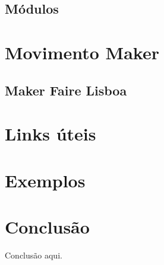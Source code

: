 \documentclass{article}
\begin{document}
\subsection{Módulos}

\section{Movimento Maker}
% 

\subsection{Maker Faire Lisboa}
%

\section{Links úteis}

\section{Exemplos}

\section{Conclusão}
Conclusão aqui.
\end{document}
